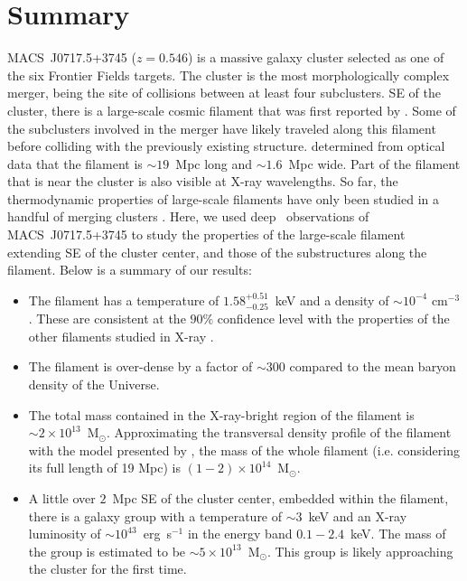 \section{Summary}
\label{sec:Summary}

MACS~J0717.5+3745 ($z=0.546$) is a massive galaxy cluster selected as one of the six Frontier Fields targets. The cluster is the most morphologically complex merger, being the site of collisions between at least four subclusters. SE of the cluster, there is a large-scale cosmic filament that was first reported by \citet{Ebeling2004}. Some of the subclusters involved in the merger have likely traveled along this filament before colliding with the previously existing structure. \citet{Jauzac2012} determined from optical data that the filament is $\sim 19$~Mpc long and $\sim 1.6$~Mpc wide. Part of the filament that is near the cluster is also visible at X-ray wavelengths. So far, the thermodynamic properties of large-scale filaments have only been studied in a handful of merging clusters \citep{Werner2008, Eckert2015, Bulbul2016}. Here, we used deep \chandra\ observations of MACS~J0717.5+3745 to study the properties of the large-scale filament extending SE of the cluster center, and those of the substructures along the filament. Below is a summary of our results:

\begin{itemize}
	\item The filament has a temperature of $1.58_{-0.25}^{+0.51}$~keV and a density of $\sim 10^{-4}$ cm$^{-3}$. These are consistent at the $90\%$ confidence level with the properties of the other filaments studied in X-ray \citep{Werner2008, Eckert2015, Bulbul2016}.
	\item The filament is over-dense by a factor of $\sim 300$ compared to the mean baryon density of the Universe.
	\item The total mass contained in the X-ray-bright region of the filament is $\sim 2\times 10^{13}$~M$_\odot$. Approximating the transversal density profile of the filament with the model presented by \citet{Gheller2015}, the mass of the whole filament (i.e. considering its full length of 19 Mpc) is $(1-2)\times 10^{14}$~M$_{\odot}$.
	\item A little over $2$~Mpc SE of the cluster center, embedded within the filament, there is a galaxy group with a temperature of $\sim 3$~keV and an X-ray luminosity of $\sim 10^{43}$~erg~s$^{-1}$ in the energy band $0.1-2.4$~keV. The mass of the group is estimated to be $\sim 5\times 10^{13}$~M$_\odot$. This group is likely approaching the cluster for the first time.
\end{itemize}